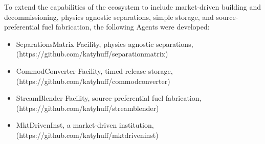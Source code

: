 
To extend the capabilities of the \Cyclus ecosystem to include market-driven 
building and decommissioning, physics agnostic separations, simple storage, and 
source-preferential fuel fabrication, the following Agents were developed:

\begin{itemize}
\item SeparationsMatrix Facility, physics agnostic separations, (https://github.com/katyhuff/separationmatrix)
\item CommodConverter Facility, timed-release storage, (https://github.com/katyhuff/commodconverter)
\item StreamBlender Facility, source-preferential fuel fabrication, (https://github.com/katyhuff/streamblender)
\item MktDrivenInst, a market-driven institution, (https://github.com/katyhuff/mktdriveninst)
\end{itemize}

